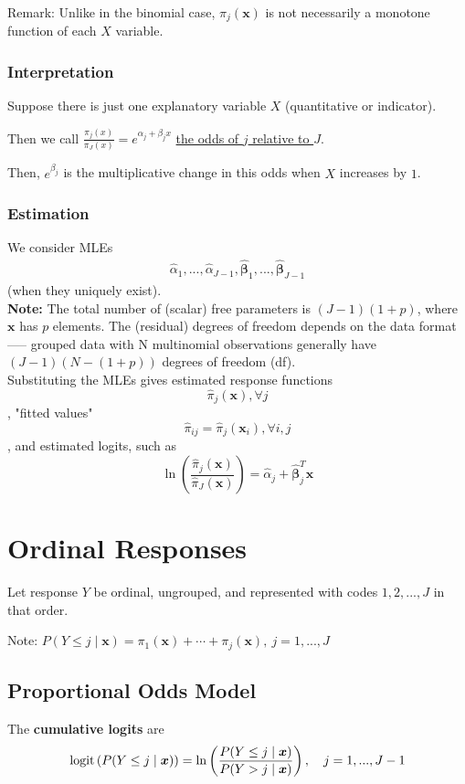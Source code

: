 \documentclass[11pt]{elegantbook}
\begin{document}
Remark: Unlike in the binomial case, $ \pi_{j}(\boldsymbol{x})$ is not necessarily a monotone function of each $X$ variable.

\subsubsection*{Interpretation}
Suppose there is just one explanatory variable $X$ (quantitative or indicator).

Then we call $\frac{\pi_{j}(x)}{\pi_J(x)}=e^{\alpha_j+\beta_j x}$ \underline{the odds of $j$ relative to $J$}.

Then, $e^{\beta_j}$ is the multiplicative change in this odds when $X$ increases by $1$.

\subsubsection*{Estimation}
We consider MLEs
\begin{equation}
    \begin{aligned}
        \hat{\alpha}_1,...,\hat{\alpha}_{J-1}, \hat{\boldsymbol{\beta}}_1,...,\hat{\boldsymbol{\beta}}_{J-1}
    \end{aligned}
    \nonumber
\end{equation}
(when they uniquely exist).\\
\textbf{Note:} The total number of (scalar) free parameters is $(J-1)(1+p)$, where $\boldsymbol{x}$ has $p$ elements. The (residual) degrees of freedom depends on the data format —-- grouped data with N multinomial observations generally have $(J-1)(N-(1+p))$ degrees of freedom (df).\\
Substituting the MLEs gives estimated response functions $$\hat{\pi}_j(\boldsymbol{x}),\forall j$$, "fitted values" $$\hat{\pi}_{ij}=\hat{\pi}_j(\boldsymbol{x}_i),\forall i,j$$, and estimated logits, such as $$\ln\left(\frac{\hat{\pi}_{j}(\boldsymbol{x})}{\hat{\pi}_J(\boldsymbol{x})}\right)=\hat{\alpha}_j+\hat{\boldsymbol{\beta}}_j^T\boldsymbol{x}$$

\section{Ordinal Responses}
Let response $Y$ be ordinal, ungrouped, and represented with codes $1,2,...,J$ in that order.

Note: $P(Y\leq j\mid \boldsymbol{x})=\pi_1(\boldsymbol{x})+\cdots+\pi_j(\boldsymbol{x}),\ j=1,...,J$

\subsection{Proportional Odds Model}
The \textbf{cumulative logits} are
\begin{equation}
    \begin{aligned}
        \textnormal{logit}\left(P(Y\leq j\mid \boldsymbol{x})\right)=\ln\left(\frac{P(Y\leq j\mid \boldsymbol{x})}{P(Y> j\mid \boldsymbol{x})}\right),\quad j=1,...,J-1
    \end{aligned}
    \nonumber
\end{equation}
\end{document}
